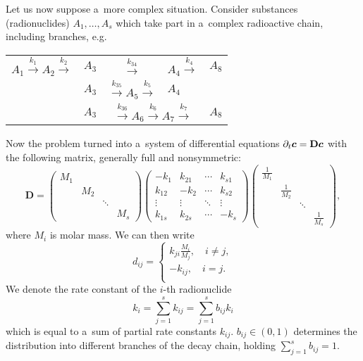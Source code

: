 Let us now suppose a~more complex situation. Consider substances (radionuclides) $A_1,\ldots, A_s$ which take 
part in a~complex radioactive chain, including branches, e.g.
\begin{center}
\begin{tabular}{rccll}
 $A_1\xrightarrow{k_1}A_2\xrightarrow{k_2}$ & $A_3$ & $ \xrightarrow{k_{34}}$ & $A_4\xrightarrow{k_4}$ & $A_8$ \\
 & $A_3$ & $\xrightarrow{k_{35}} A_5 \xrightarrow{k_{5}}$ & $A_4$ &\\
 & $A_3$ & \multicolumn{2}{c}{$\xrightarrow{k_{36}} A_6 \xrightarrow{k_{6}} A_7 \xrightarrow{k_{7}}$} & $A_8$
\end{tabular}
\end{center}
Now the problem turned into a~system of differential equations $\partial_t \mathbf{\boldsymbol{c}}=\mathbf{D}\mathbf{\boldsymbol{c}}$ with the following
matrix, generally full and nonsymmetric:
\[
\mathbf{D} = \begin{pmatrix} M_1 &     && \\ 
                                 & M_2 && \\
                                 && \ddots & \\
                  && & M_s \end{pmatrix}
             \begin{pmatrix} -k_1 &k_{21}& \cdots & k_{s1} \\ 
                  k_{12} & -k_2 & \cdots & k_{s2} \\
                  \vdots &\vdots& \ddots & \vdots \\
                  k_{1s} &k_{2s}& \cdots & -k_s \end{pmatrix}
             \begin{pmatrix} \frac{1}{M_1} &     && \\ 
                                 & \frac{1}{M_2} && \\
                                 && \ddots & \\
                  && & \frac{1}{M_s} \end{pmatrix},
\]
where $M_i$ is molar mass. We can then write
\begin{equation} \label{eqn:reaction_system_entries}
d_{ij} =
  \begin{cases}
  k_{ji} \frac{M_i}{M_j}, \quad i\neq j, \\
  -k_{ij}, \quad i=j. \\
  \end{cases}
\end{equation}
We denote the rate constant of the $i$-th radionuclide
\[
  k_i=\sum_{j=1}^{s}k_{ij}=\sum_{j=1}^{s}b_{ij}k_i
\]
which is equal to a~sum of partial rate constants $k_{ij}$.  $b_{ij}\in(0,1)$ 
determines the distribution into different branches of the decay chain, holding $\sum_{j=1}^{s}b_{ij}=1$.

